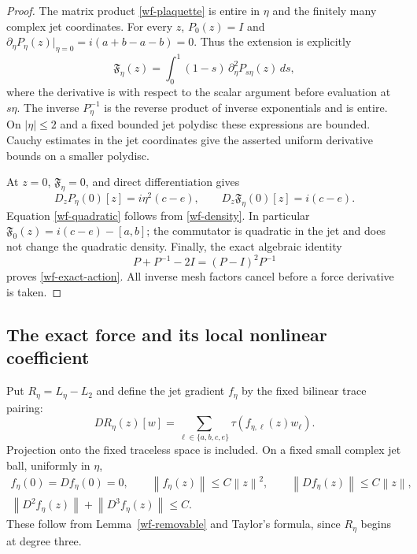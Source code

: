 \documentclass[11pt]{article}
\theoremstyle{remark}
\newcommand{\norm}[1]{\left\|#1\right\|}
\begin{document}
\begin{proof}
The matrix product \eqref{wf-plaquette} is entire in $\eta$
and the finitely many complex jet coordinates. For every $z$,
$P_0(z)=I$ and
$\partial_\eta P_\eta(z)|_{\eta=0}=i(a+b-a-b)=0$.
Thus the extension is explicitly
\begin{equation}\label{wf-removable-integral}
 \mathfrak F_\eta(z)
  =\int_0^1(1-s)\,\partial_\eta^2P_{s\eta}(z)\,ds,
\end{equation}
where the derivative is with respect to the scalar argument
before evaluation at $s\eta$. The inverse $P_\eta^{-1}$ is
the reverse product of inverse exponentials and is entire.
On $|\eta|\le2$ and a fixed bounded jet polydisc these
expressions are bounded. Cauchy estimates in the jet
coordinates give the asserted uniform derivative bounds
on a smaller polydisc.

At $z=0$, $\mathfrak F_\eta=0$, and direct differentiation
gives
\begin{equation}\label{wf-linear-F}
 D_zP_\eta(0)[z]=i\eta^2(c-e),\qquad
 D_z\mathfrak F_\eta(0)[z]=i(c-e).
\end{equation}
Equation \eqref{wf-quadratic} follows from
\eqref{wf-density}. In particular
$\mathfrak F_0(z)=i(c-e)-[a,b]$; the commutator is quadratic
in the jet and does not change the quadratic density.
Finally, the exact algebraic identity
\[
 P+P^{-1}-2I=(P-I)^2P^{-1}
\]
proves \eqref{wf-exact-action}. All inverse mesh factors
cancel before a force derivative is taken.
\end{proof}

\subsection{The exact force and its local nonlinear coefficient}

Put $R_\eta=L_\eta-L_2$ and define the jet gradient $f_\eta$
by the fixed bilinear trace pairing:
\begin{equation}\label{wf-gradient-definition}
 DR_\eta(z)[w]=\sum_{\ell\in\{a,b,c,e\}}
                                \tau(f_{\eta,\ell}(z)w_\ell).
\end{equation}
Projection onto the fixed traceless space is included. On a
fixed small complex jet ball, uniformly in $\eta$,
\begin{equation}\label{wf-pointwise-bounds}
 \begin{gathered}
 f_\eta(0)=Df_\eta(0)=0,\qquad
 \norm{f_\eta(z)}\le C\norm{z}^2,\qquad
 \norm{Df_\eta(z)}\le C\norm{z},\\
 \norm{D^2f_\eta(z)}+\norm{D^3f_\eta(z)}\le C.
 \end{gathered}
\end{equation}
These follow from Lemma~\ref{wf-removable} and Taylor's
formula, since $R_\eta$ begins at degree three.
\end{document}
